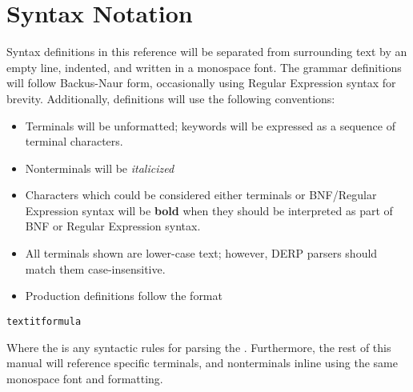 \section{Syntax Notation}
Syntax definitions in this reference will be separated from surrounding text by an empty line,
indented, and written in a monospace font. The grammar definitions will follow Backus-Naur form,
occasionally using Regular Expression syntax for brevity. Additionally, definitions will use the following conventions:

\begin{itemize}
\item Terminals will be unformatted; keywords will be expressed as a sequence of terminal characters.
\item Nonterminals will be \textit{italicized}
\item Characters which could be considered either terminals or BNF/Regular Expression syntax will be \textbf{bold} when they should be interpreted as part of BNF or Regular Expression syntax.
\item All terminals shown are lower-case text; however, DERP parsers should match them case-insensitive.
\item Production definitions follow the format
\end{itemize}
\begin{description}[labelindent=1cm,leftmargin=\onelen,labelwidth=1cm]
 \texttt{textit{formula}}
\end{description}


Where the  is any syntactic rules for parsing the .
Furthermore,  the rest of this manual will reference specific terminals, and nonterminals inline using the same monospace font and formatting.
